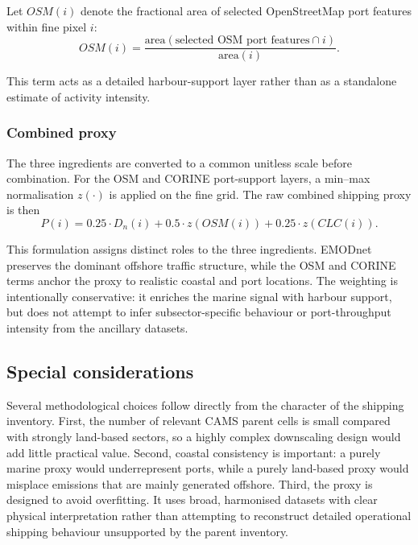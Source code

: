 Let $OSM(i)$ denote the fractional area of selected OpenStreetMap port
features within fine pixel $i$:
\begin{equation}
  OSM(i) =
  \frac{
    \mathrm{area}\!\left(
      \text{selected OSM port features} \cap i
    \right)
  }{
    \mathrm{area}(i)
  }.
\end{equation}

This term acts as a detailed harbour-support layer rather than as a
standalone estimate of activity intensity.

\subsubsection{Combined proxy}

The three ingredients are converted to a common unitless scale before
combination. For the OSM and CORINE port-support layers, a min--max
normalisation $z(\cdot)$ is applied on the fine grid. The raw combined
shipping proxy is then
\begin{equation}
  P(i) =
  0.25 \cdot D_n(i)
  + 0.5 \cdot z\!\left(OSM(i)\right)
  + 0.25 \cdot z\!\left(CLC(i)\right).
\end{equation}

This formulation assigns distinct roles to the three ingredients.
EMODnet preserves the dominant offshore traffic structure, while the OSM
and CORINE terms anchor the proxy to realistic coastal and port
locations. The weighting is intentionally conservative: it enriches the
marine signal with harbour support, but does not attempt to infer
subsector-specific behaviour or port-throughput intensity from the
ancillary datasets.

\subsection{Special considerations}

Several methodological choices follow directly from the character of the
shipping inventory. First, the number of relevant CAMS parent cells is
small compared with strongly land-based sectors, so a highly complex
downscaling design would add little practical value. Second, coastal
consistency is important: a purely marine proxy would underrepresent
ports, while a purely land-based proxy would misplace emissions that are
mainly generated offshore. Third, the proxy is designed to avoid
overfitting. It uses broad, harmonised datasets with clear physical
interpretation rather than attempting to reconstruct detailed operational
shipping behaviour unsupported by the parent inventory.


